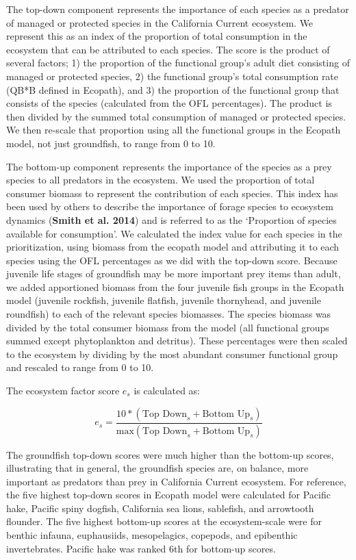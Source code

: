 \documentclass[12pt,]{article}
\begin{document}
The top-down component represents the importance of each species as a
predator of managed or protected species in the California Current
ecosystem. We represent this as an index of the proportion of total
consumption in the ecosystem that can be attributed to each species. The
score is the product of several factors; 1) the proportion of the
functional group's adult diet consisting of managed or protected
species, 2) the functional group's total consumption rate (QB*B defined
in Ecopath), and 3) the proportion of the functional group that consists
of the species (calculated from the OFL percentages). The product is
then divided by the summed total consumption of managed or protected
species. We then re-scale that proportion using all the functional
groups in the Ecopath model, not just groundfish, to range from 0 to 10.

The bottom-up component represents the importance of the species as a
prey species to all predators in the ecosystem. We used the proportion
of total consumer biomass to represent the contribution of each species.
This index has been used by others to describe the importance of forage
species to ecosystem dynamics (\textbf{Smith et al. 2014}) and is
referred to as the `Proportion of species available for consumption'. We
calculated the index value for each species in the prioritization, using
biomass from the ecopath model and attributing it to each species using
the OFL percentages as we did with the top-down score. Because juvenile
life stages of groundfish may be more important prey items than adult,
we added apportioned biomass from the four juvenile fish groups in the
Ecopath model (juvenile rockfish, juvenile flatfish, juvenile
thornyhead, and juvenile roundfish) to each of the relevant species
biomasses. The species biomass was divided by the total consumer biomass
from the model (all functional groups summed except phytoplankton and
detritus). These percentages were then scaled to the ecosystem by
dividing by the most abundant consumer functional group and rescaled to
range from 0 to 10.

The ecosystem factor score \(e_s\) is calculated as:

\[
e_s = \frac{10*(\text{Top Down}_s + \text{Bottom Up}_s)}{\text{max}(\text{Top Down}_s + \text{Bottom Up}_s)}
\]

The groundfish top-down scores were much higher than the bottom-up
scores, illustrating that in general, the groundfish species are, on
balance, more important as predators than prey in California Current
ecosystem. For reference, the five highest top-down scores in Ecopath
model were calculated for Pacific hake, Pacific spiny dogfish,
California sea lions, sablefish, and arrowtooth flounder. The five
highest bottom-up scores at the ecosystem-scale were for benthic
infauna, euphausiids, mesopelagics, copepods, and epibenthic
invertebrates. Pacific hake was ranked 6th for bottom-up scores.
\end{document}

